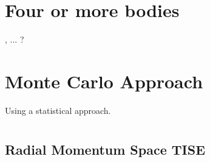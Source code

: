 \documentclass[12pt,a4paper]{report}
\begin{document}
\chapter{Four or more bodies}
\label{cha:four_or_more_bodies}

,  ... ?

\chapter{Monte Carlo Approach}
\label{cha:monte_carlo}

Using a statistical approach.

\appendix

\chapter{}

\section{Radial Momentum Space TISE}
\label{sec:radial_mom_space_TISE}


\end{document}
